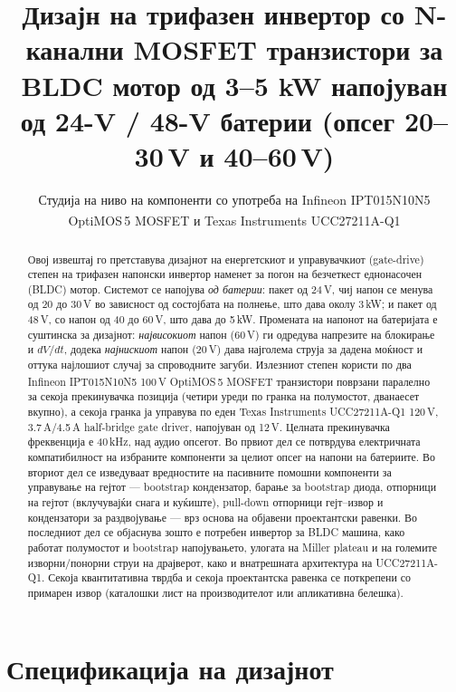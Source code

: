 \documentclass[11pt,a4paper]{article}
\title{\bfseries Дизајн на трифазен инвертор со N-канални MOSFET транзистори за BLDC мотор од 3--5 kW напојуван од 24-V / 48-V батерии (опсег 20--30\,V и 40--60\,V)}
\author{Студија на ниво на компоненти со употреба на Infineon IPT015N10N5\\
OptiMOS\textsuperscript{\texttrademark}\,5 MOSFET и Texas Instruments UCC27211A-Q1 \eng{half-bridge gate driver}}
\date{}
\newcommand{\eng}[1]{\textenglish{#1}}
\begin{document}
\maketitle

\begin{abstract}
\noindent
Овој извештај го претставува дизајнот на енергетскиот и управувачкиот (\eng{gate-drive}) степен на трифазен напонски инвертор наменет за погон на безчеткест еднонасочен (BLDC) мотор. Системот се напојува \emph{од батерии}: пакет од 24\,V, чиј напон се менува од 20 до 30\,V во зависност од состојбата на полнење, што дава околу 3\,kW; и пакет од 48\,V, со напон од 40 до 60\,V, што дава до 5\,kW. Промената на напонот на батеријата е суштинска за дизајнот: \emph{највисокиот} напон (60\,V) ги одредува напрезите на блокирање и $dV/dt$, додека \emph{најнискиот} напон (20\,V) дава најголема струја за дадена моќност и оттука најлошиот случај за спроводните загуби. Излезниот степен користи по два Infineon IPT015N10N5 100\,V OptiMOS\textsuperscript{\texttrademark}\,5 MOSFET транзистори поврзани паралелно за секоја прекинувачка позиција (четири уреди по гранка на полумостот, дванаесет вкупно), а секоја гранка ја управува по еден Texas Instruments UCC27211A-Q1 120\,V, 3.7\,A/4.5\,A \eng{half-bridge gate driver}, напојуван од 12\,V. Целната прекинувачка фреквенција е 40\,kHz, над аудио опсегот. Во првиот дел се потврдува електричната компатибилност на избраните компоненти за целиот опсег на напони на батериите. Во вториот дел се изведуваат вредностите на пасивните помошни компоненти за управување на гејтот --- \eng{bootstrap} кондензатор, барање за \eng{bootstrap} диода, отпорници на гејтот (вклучувајќи снага и куќиште), \eng{pull-down} отпорници гејт--извор и кондензатори за раздвојување --- врз основа на објавени проектантски равенки. Во последниот дел се објаснува зошто е потребен инвертор за BLDC машина, како работат полумостот и \eng{bootstrap} напојувањето, улогата на \eng{Miller plateau} и на големите изворни/понорни струи на драјверот, како и внатрешната архитектура на UCC27211A-Q1. Секоја квантитативна тврдба и секоја проектантска равенка се поткрепени со примарен извор (каталошки лист на производителот или апликативна белешка).
\end{abstract}

\section{Спецификација на дизајнот}
\end{document}
